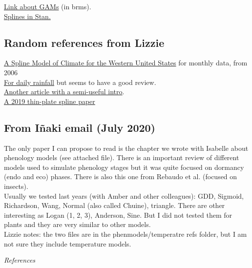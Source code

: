\documentclass[11pt,letter]{article}
\begin{document}
\href{https://fromthebottomoftheheap.net/2018/04/21/fitting-gams-with-brms/}{Link about GAMs} (in brms).\\

\href{https://github.com/milkha/Splines_in_Stan/blob/master/splines_in_stan.pdf}{Splines in Stan.}\\

\subsection{Random references from Lizzie}

\href{https://www.fs.fed.us/rm/pubs/rmrs_gtr165.pdf}{A Spline Model of Climate for the
Western United States} for monthly data, from 2006\\

\href{https://rmets.onlinelibrary.wiley.com/doi/pdf/10.1002/joc.4068}{For daily rainfall} but seems to have a good review. \\

\href{https://agupubs.onlinelibrary.wiley.com/doi/full/10.1002/2013JD020803}{Another article with a semi-useful intro}.\\

\href{https://www.nature.com/articles/sdata2018299}{A 2019 thin-plate spline paper}

\subsection{From I\~naki email (July 2020)}

The only paper I can propose to read is the chapter we wrote with Isabelle about phenology models (see attached file). There is an important review of different models used to simulate phenology stages  but it was quite focused on dormancy (endo and eco) phases. 
There is also this one from Rebaudo et al. (focused on insects).\\

Usually we tested last years (with Amber and other colleagues): GDD, Sigmoid, Richardson, Wang, Normal (also called Chuine), triangle. 
There are other interesting as Logan (1, 2, 3), Anderson, Sine. But I did not tested them for plants and they are very similar to other models. \\

Lizzie notes: the two files are in the phenmodels/temperatre refs folder, but I am not sure they include temperature models.


\renewcommand{\refname}{\CHead{}}

\emph{References}

\end{document}
